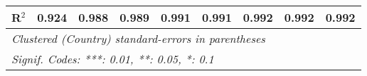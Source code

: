 \begin{table}[htbp]
\begin{tabular}{lcccccccc}
      R$^2$                                                                    & 0.924   & 0.988   & 0.989         & 0.991          & 0.991          & 0.992          & 0.992          & 0.992\\  
      \midrule
      \multicolumn{9}{l}{\emph{Clustered (Country) standard-errors in parentheses}}\\
      \multicolumn{9}{l}{\emph{Signif. Codes: ***: 0.01, **: 0.05, *: 0.1}}\\
   \end{tabular}
\end{table}


